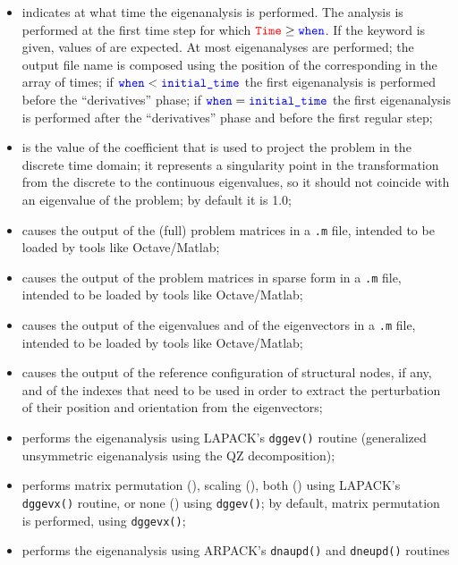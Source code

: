 \begin{itemize}
\item {} indicates at what time the eigenanalysis is performed.
	The analysis is performed at the first time step for which
	$\textcolor{red}{\texttt{Time}} \ge \textcolor{blue}{\texttt{when}}$.
	If the keyword  is given,  values
	of  are expected.  At most  eigenanalyses
	are performed; the output file name is composed using
	the position of the corresponding  in the array
	of times;
	if $\textcolor{blue}{\texttt{when}} < \textcolor{blue}{\texttt{initial\_time}}$ the first eigenanalysis
	is performed before the ``derivatives'' phase;
	if $\textcolor{blue}{\texttt{when}} = \textcolor{blue}{\texttt{initial\_time}}$ the first eigenanalysis
	is performed after the ``derivatives'' phase
	and before the first regular step;
\item {} is the value of the coefficient that is used to project
	the problem in the discrete time domain; it represents
	a singularity point in the transformation from the discrete
	to the continuous eigenvalues, so it should not coincide with
	an eigenvalue of the problem;  by default it is 1.0;
\item {} causes the output
	of the (full) problem matrices in a \texttt{.m} file,
	intended to be loaded by tools like Octave/Matlab;
\item {} causes the output
	of the problem matrices in sparse form in a \texttt{.m} file,
	intended to be loaded by tools like Octave/Matlab;
\item {} causes the output of the eigenvalues
	and of the eigenvectors in a \texttt{.m} file,
	intended to be loaded by tools like Octave/Matlab;
\item {} causes the output of the reference
	configuration of structural nodes, if any,
	and of the indexes that need to be used in order to extract
	the perturbation of their position and orientation
	from the eigenvectors;
\item {} performs the eigenanalysis using
	LAPACK's \texttt{dggev()} routine (generalized unsymmetric eigenanalysis
	using the QZ decomposition);
\item {} performs matrix permutation (),
	scaling (), both () using LAPACK's
	\texttt{dggevx()} routine, or none () using \texttt{dggev()};
	by default, matrix permutation is performed, using \texttt{dggevx()};
\item {} performs the eigenanalysis using
	ARPACK's \texttt{dnaupd()} and \texttt{dneupd()} routines

\end{itemize}
